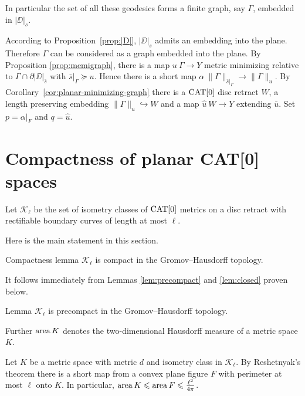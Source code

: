 \documentclass{article}
\begin{document}

In particular the set of all these geodesics forms a finite graph, say $\Gamma$,
embedded in $|\DD|_s$. 

According to Proposition~\ref{prop:|D|},
$|\DD|_s$ admits an embedding into the plane.
Therefore $\Gamma$ can be considered as a graph embedded into the plane.
By Proposition \ref{prop:memigraph}, there is a map $u\:\Gamma\to Y$ metric minimizing relative to $\Gamma\cap\partial|\DD|_{\bar s}$ with
$\bar s|_\Gamma\succcurlyeq u$.
Hence there is a short map $\alpha\:\|\Gamma\|_{\bar s|_\Gamma}\to\|\Gamma\|_u$. 
By Corollary~\ref{cor:planar-minimizing-graph} there is a $\mathop{\rm CAT}\nolimits[0]$ disc retract $W$, a length preserving embedding
$\|\Gamma\|_u\hookrightarrow W$ and a map $\hat u\:W\to Y$ extending $\bar u$. %
Set $p=\alpha|_F$ and $q=\hat u$.
\qeds

\section{Compactness of planar CAT[0] spaces}\label{Compactness}

Let $\mathcal{K}_\ell$ be the set of isometry classes of $\mathop{\rm CAT}\nolimits[0]$ metrics on a disc retract with rectifiable
boundary curves of length at most $\ell$.


Here is the main statement in this section.

\begin{thm}{Compactness lemma}\label{lem:compact}
$\mathcal{K}_\ell$ is compact in the Gromov--Hausdorff topology.
\end{thm}

It follows immediately from Lemmas \ref{lem:precompact} and \ref{lem:closed} proven below.

\begin{thm}{Lemma}\label{lem:precompact}
$\mathcal{K}_\ell$ is precompact in the Gromov--Hausdorff topology.
\end{thm}

Further $\mathop{\rm area}\nolimits K$ denotes the two-dimensional Hausdorff measure of a metric space $K$. 

Let $K$ be a metric space with metric $d$ and isometry class in $\mathcal {K}_\ell$.
By Reshetnyak's theorem there is a short map from a convex plane figure $F$ with perimeter at most $\ell$ onto $K$.
In particular, $\mathop{\rm area}\nolimits K \leqslant \mathop{\rm area}\nolimits F \leqslant \tfrac{\ell^2}{4\pi}$.
\end{document}
